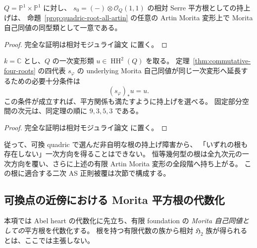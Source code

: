 \begin{corollary}
\label{cor:quadric-root-unique-all-artin}
$Q=\mathbb P^1\times\mathbb P^1$ に対し、
$s_0=(-)\otimes\mathcal O_Q(1,1)$ の相対 Serre 平方根としての持上げは、
命題~\ref{prop:quadric-root-all-artin} の任意の Artin Morita 変形上で
Morita 自己同値の同型類として一意である。
\end{corollary}
\begin{proof}
完全な証明は相対モジュライ論文 \cite[\texttt{artin_roots}]{QuadricModuli2026} に置く。
\end{proof}

\begin{proposition}[四つの根の一次持上げ条件]
\label{prop:quadric-four-root-tangents}
$k=\mathbb C$ とし、$Q$ の一次変形類
$u\in\operatorname{HH}^2(Q)$ を取る。
定理~\ref{thm:commutative-four-roots} の四代表 $s_\varphi$ の underlying
Morita 自己同値が同じ一次変形へ延長するための必要十分条件は
\[
 (s_\varphi)_*u=u.
\]
この条件が成立すれば、平方関係も満たすように持上げを選べる。
固定部分空間の次元は、同定理の順に $9,3,5,3$ である。
\end{proposition}
\begin{proof}
完全な証明は相対モジュライ論文 \cite[\texttt{artin_roots}]{QuadricModuli2026} に置く。
\end{proof}

従って、可換 quadric で選んだ非自明な根の持上げ障害から、
「いずれの根も存在しない」一次方向を得ることはできない。
恒等幾何型の根は全九次元の一次方向を覆い、さらに上述の有限 Artin
Morita 変形の全段階へ持ち上がる。
この根に適合する二次 AS 正則被覆は次節で構成する。


\subsection{可換点の近傍における Morita 平方根の代数化}
\label{subsec:quadric-etale-morita-root}

本項では Abel heart の代数化に先立ち、有限 foundation の
\emph{Morita 自己同値としての}平方根を代数化する。
根を持つ有限代数の族から相対 $\mathfrak H_2$ 族が得られるとは、ここでは主張しない。

